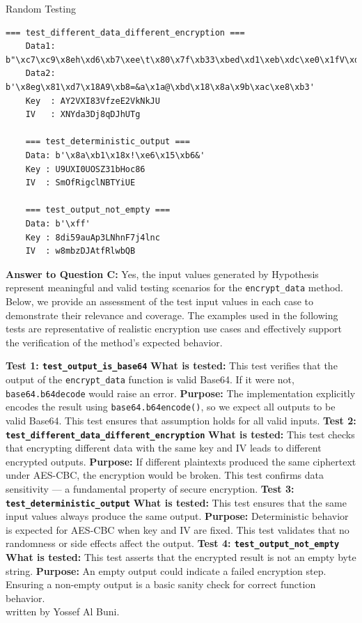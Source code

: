 \documentclass[a4paper]{scrreprt}
\newcounter{question}
\begin{document}
\begin{question}{Random Testing}
\begin{enumerate}[topsep=0pt, leftmargin=*]
\begin{answer}
\begin{lstlisting}[caption={Yossef Al Buni -- Inputs for the Hypothesis-Tests in test\_encrypt\_data\_4}, label={lst:encryption}]
    === test_different_data_different_encryption ===
    Data1: b"\xc7\xc9\x8eh\xd6\xb7\xee\t\x80\x7f\xb33\xbed\xd1\xeb\xdc\xe0\x1fV\xd7\x1d/\x95\x01\xb4Q\n\xdf\x85\x04T\xc8\x87\xb45\x86'\xb4\xb7"
    Data2: b'\x8eg\x81\xd7\x18A9\xb8=&a\x1a@\xbd\x18\x8a\x9b\xac\xe8\xb3'
    Key  : AY2VXI83VfzeE2VkNkJU
    IV   : XNYda3Dj8qDJhUTg
    
    === test_deterministic_output ===
    Data: b'\x8a\xb1\x18x!\xe6\x15\xb6&'
    Key : U9UXI0UOSZ31bHoc86
    IV  : SmOfRigclNBTYiUE
    
    === test_output_not_empty ===
    Data: b'\xff'
    Key : 8di59auAp3LNhnF7j4lnc
    IV  : w8mbzDJAtfRlwbQB
    \end{lstlisting} 
\textbf{Answer to Question C:} Yes, the input values generated by Hypothesis represent meaningful and valid testing scenarios for the \texttt{encrypt\_data} method. Below, we provide an assessment of the test input values in each case to demonstrate their relevance and coverage. The examples used in the following tests are representative of realistic encryption use cases and effectively support the verification of the method’s expected behavior.

\textbf{Test 1: \texttt{test\_output\_is\_base64}}
\textbf{What is tested:}  
This test verifies that the output of the \texttt{encrypt\_data} function is valid Base64. If it were not, \texttt{base64.b64decode} would raise an error.
\textbf{Purpose:}  
The implementation explicitly encodes the result using \texttt{base64.b64encode()}, so we expect all outputs to be valid Base64. This test ensures that assumption holds for all valid inputs.
\textbf{Test 2: \texttt{test\_different\_data\_different\_encryption}}
\textbf{What is tested:}  
This test checks that encrypting different data with the same key and IV leads to different encrypted outputs.
\textbf{Purpose:}    
If different plaintexts produced the same ciphertext under AES-CBC, the encryption would be broken. This test confirms data sensitivity — a fundamental property of secure encryption.
\textbf*{Test 3: \texttt{test\_deterministic\_output}}
\textbf{What is tested:}  
This test ensures that the same input values always produce the same output.
\textbf{Purpose:}   
Deterministic behavior is expected for AES-CBC when key and IV are fixed. This test validates that no randomness or side effects affect the output.
\textbf{Test 4: \texttt{test\_output\_not\_empty}}
\textbf{What is tested:}  
This test asserts that the encrypted result is not an empty byte string.
\textbf{Purpose:}    
An empty output could indicate a failed encryption step. Ensuring a non-empty output is a basic sanity check for correct function behavior. \\
written by Yossef Al Buni. \\


\end{answer}
\end{enumerate}
\end{question}
\end{document}
